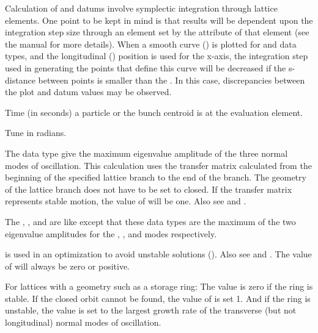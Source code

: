 \begin{description}
{{{{Calculation of  and  datums involve symplectic integration
through lattice elements. One point to be kept in mind is that results will be dependent upon the
integration step size through an element set by the  attribute of that element (see the
\bmad manual for more details). When a smooth curve () is plotted for 
and  data types, and the longitudinal () position is used for the
x-axis, the integration step used in generating the points that define this curve will be decreased
if the s-distance between points is smaller than the .  In this case, discrepancies
between the plot and datum values may be observed.

  \item[time] \Newline {}
Time (in seconds) a particle or the bunch centroid is at the evaluation element.

  \item[tune.a, .b, .z] \Newline {}
Tune in radians.

  \item[unstable.eigen, unstable.eigen.a, .eigen.b, .eigen.c] \Newline {}
The  data type give the maximum eigenvalue amplitude of the three normal modes
of oscillation. This calculation uses the transfer matrix calculated from the beginning of the
specified lattice branch to the end of the branch. The geometry of the lattice branch does not have
to be set to closed. If the transfer matrix represents stable motion, the value of
 will be one. Also see  and .

The , , and  are like
 except that these data types are the maximum of the two eigenvalue amplitudes
for the , , and  modes respectively.

  \item[unstable.lattice] \Newline {}

 is used in an optimization to avoid unstable solutions ().
Also see  and .  The value of  will
always be zero or positive.

For lattices with a  geometry such as a storage ring: The value  is
zero if the ring is stable. If the closed orbit cannot be found, the value of 
is set 1. And if the ring is unstable, the value is set to the largest growth rate of the transverse
(but not longitudinal) normal modes of oscillation.

}}}}
\end{description}
